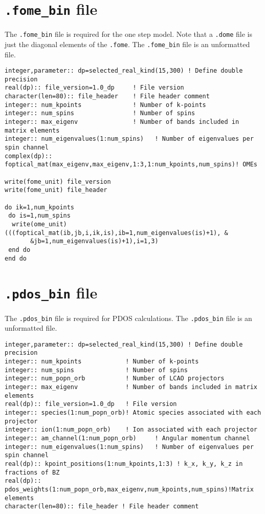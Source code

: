\documentclass[a4paper,11pt,twoside]{book}
\begin{document}
\begin{appendix}
\section{\texttt{.fome\_bin} file}
The \texttt{.fome\_bin} file is required for the one step model.
%
Note that a \texttt{.dome} file is just the diagonal elements of the \texttt{.fome}.
%
The \texttt{.fome\_bin} file is an unformatted file.
\begin{verbatim}
integer,parameter:: dp=selected_real_kind(15,300) ! Define double precision
real(dp):: file_version=1.0_dp     ! File version
character(len=80):: file_header    ! File header comment
integer:: num_kpoints              ! Number of k-points
integer:: num_spins                ! Number of spins
integer:: max_eigenv               ! Number of bands included in matrix elements
integer:: num_eigenvalues(1:num_spins)   ! Number of eigenvalues per spin channel
complex(dp):: foptical_mat(max_eigenv,max_eigenv,1:3,1:num_kpoints,num_spins)! OMEs

write(fome_unit) file_version
write(fome_unit) file_header

do ik=1,num_kpoints
 do is=1,num_spins
  write(ome_unit) (((foptical_mat(ib,jb,i,ik,is),ib=1,num_eigenvalues(is)+1), &
       &jb=1,num_eigenvalues(is)+1),i=1,3)
 end do
end do
\end{verbatim}

\section{\texttt{.pdos\_bin} file}
The \texttt{.pdos\_bin} file is required for PDOS calculations.
%
The \texttt{.pdos\_bin} file is an unformatted file.
\begin{verbatim}
integer,parameter:: dp=selected_real_kind(15,300) ! Define double precision
integer:: num_kpoints            ! Number of k-points
integer:: num_spins              ! Number of spins
integer:: num_popn_orb           ! Number of LCAO projectors
integer:: max_eigenv             ! Number of bands included in matrix elements
real(dp):: file_version=1.0_dp   ! File version
integer:: species(1:num_popn_orb)! Atomic species associated with each projector
integer:: ion(1:num_popn_orb)    ! Ion associated with each projector
integer:: am_channel(1:num_popn_orb)     ! Angular momentum channel
integer:: num_eigenvalues(1:num_spins)   ! Number of eigenvalues per spin channel
real(dp):: kpoint_positions(1:num_kpoints,1:3) ! k_x, k_y, k_z in fractions of BZ
real(dp):: pdos_weights(1:num_popn_orb,max_eigenv,num_kpoints,num_spins)!Matrix elements
character(len=80):: file_header ! File header comment


\end{verbatim}
\end{appendix}
\end{document}

